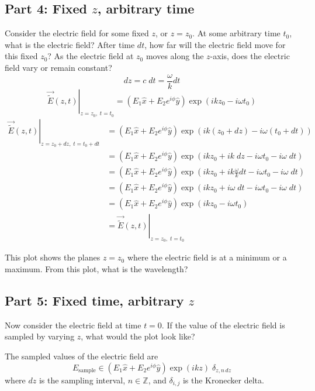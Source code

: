 \documentclass{article}
\begin{document}
\subsection{Part 4: Fixed $z$, arbitrary time}
Consider the electric field for some fixed $z$, or $z=z_0$.  At some arbitrary time $t_0$, what is the electric field?  After time $dt$,  how far will the electric field move for this fixed $z_0$?  As the electric field at $z_0$ moves along the $z$-axis, does the electric field vary or remain constant?
\begin{equation}
    dz = c\;dt = \frac{\omega}{k}dt
\end{equation}
\begin{equation}
    \left.\vec{\widetilde{E}}\left(z,t\right)\right\rvert_{z=z_0,\;t=t_0} = \left(E_1\hat{x} + E_2e^{i\phi}\hat{y}\right) \exp \left(ikz_0- i \omega t_0\right)
\end{equation}
\begin{align}
     \left.\vec{\widetilde{E}}\left(z,t\right)\right\rvert_{z=z_0+dz,\;t=t_0+dt} &= \left(E_1\hat{x} + E_2e^{i\phi}\hat{y}\right) \exp \left(ik(z_0+dz)- i \omega (t_0+dt)\right)   \\
     &= \left(E_1\hat{x} + E_2e^{i\phi}\hat{y}\right) \exp \left(ikz_0+ik\;dz- i \omega t_0- i \omega\;dt\right)   \\
     &= \left(E_1\hat{x} + E_2e^{i\phi}\hat{y}\right) \exp \left(ikz_0+ik\frac{\omega}{k}dt- i \omega t_0- i \omega\;dt\right)   \\
     &= \left(E_1\hat{x} + E_2e^{i\phi}\hat{y}\right) \exp \left(ikz_0+i\omega\; dt- i \omega t_0- i \omega\;dt\right)   \\
     &= \left(E_1\hat{x} + E_2e^{i\phi}\hat{y}\right) \exp \left(ikz_0- i \omega t_0\right)   \\
     &=\left.\vec{\widetilde{E}}\left(z,t\right)\right\rvert_{z=z_0,\;t=t_0}
\end{align}

This plot shows the planes $z=z_0$ where the electric field is at a minimum or a maximum.  From this plot, what is the wavelength?
\subsection{Part 5: Fixed time, arbitrary $z$}
Now consider the electric field at time $t=0$.  If the value of the electric field is sampled by varying $z$, what would the plot look like?

The sampled values of the electric field are
\begin{equation}
    E_{\text{sample}} \in \left(E_1\hat{x} + E_2e^{i\phi}\hat{y}\right) \exp \left(ikz\right)   \;\delta_{z,n\,dz}
\end{equation}
where $dz$ is the sampling interval, $n \in \mathbb{Z}$, and $\delta_{i,j}$ is the Kronecker delta.
\end{document}
